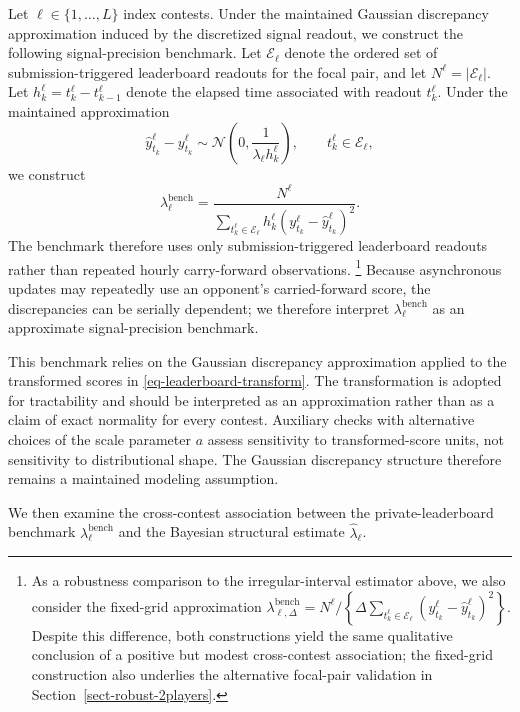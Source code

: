 \documentclass[mnsc]{informs3}
\begin{document}
Let $\ell\in\{1,\ldots,L\}$ index contests.
Under the maintained Gaussian discrepancy approximation induced by the discretized signal readout, we construct the following signal-precision benchmark.
Let $\mathcal E_\ell$ denote the ordered set of submission-triggered leaderboard readouts for the focal pair, and let $N^\ell=|\mathcal E_\ell|$.
Let $h_k^\ell=t_k^\ell-t_{k-1}^\ell$ denote the elapsed time associated with readout $t_k^\ell$.
Under the maintained approximation
\[
\hat y_{t_k}^\ell-y_{t_k}^\ell
\sim
\mathcal N\!\left(0,\frac{1}{\lambda_\ell h_k^\ell}\right),
\qquad t_k^\ell\in\mathcal E_\ell,
\]
we construct
\begin{equation*}
\lambda^{\text{bench}}_\ell =
\frac{N^\ell}
{\sum_{t_k^\ell\in\mathcal E_\ell}
h_k^\ell (y_{t_k}^\ell - \hat{y}_{t_k}^\ell)^2}.
\end{equation*}
The benchmark therefore uses only submission-triggered leaderboard readouts rather than repeated hourly carry-forward observations.
\footnote{
As a robustness comparison to the irregular-interval estimator above, we also consider the fixed-grid approximation $\lambda_{\ell,\Delta}^{\mathrm{bench}}=N^\ell/\left\{\Delta\sum_{t_k^\ell\in\mathcal E_\ell}(y_{t_k}^\ell-\hat y_{t_k}^\ell)^2\right\}$. 
Despite this difference, both constructions yield the same qualitative conclusion of a positive but modest cross-contest association; the fixed-grid construction also underlies the alternative focal-pair validation in Section~\ref{sect-robust-2players}.
}
Because asynchronous updates may repeatedly use an opponent's carried-forward score, the discrepancies can be serially dependent; we therefore interpret $\lambda_\ell^{\mathrm{bench}}$ as an approximate signal-precision benchmark.

This benchmark relies on the Gaussian discrepancy approximation applied to the transformed scores in \eqref{eq-leaderboard-transform}.
The transformation is adopted for tractability and should be interpreted as an approximation rather than as a claim of exact normality for every contest. Auxiliary checks with alternative choices of the scale parameter $a$ assess sensitivity to transformed-score units, not sensitivity to distributional shape. The Gaussian discrepancy structure therefore remains a maintained modeling assumption.

We then examine the cross-contest association between the private-leaderboard benchmark $\lambda_\ell^{\mathrm{bench}}$ and the Bayesian structural estimate $\hat\lambda_\ell$.
\end{document}
